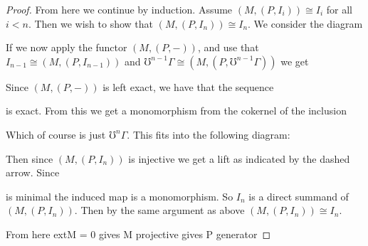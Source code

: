 \begin{theorem}
\begin{proof}
		From here we continue by induction. Assume $(M,(P,I_i)) \cong I_i$ for all $i < n$. Then we wish to show that $(M, (P, I_n)) \cong I_n$. We consider the diagram
		\begin{center}
		\end{center}
		If we now apply the functor $(M, (P, -))$, and use that $I_{n-1} \cong (M,(P,I_{n-1}))$ and $\mho^{n-1}\Gamma \cong (M,(P,\mho^{n-1}\Gamma))$ we get
		\begin{center}
		\end{center}
		
		Since $(M,(P,-))$ is left exact, we have that the sequence 
		\begin{center}
		\end{center}
		is exact. From this we get a monomorphism from the cokernel of the inclusion 
		Which of course is just $\mho^n\Gamma$. This fits into the following diagram:
		\begin{center}
		\end{center}
		
		Then since $(M, (P, I_n))$ is injective we get a lift as indicated by the dashed arrow. Since 
		is minimal the induced map is a monomorphism. So $I_n$ is a direct summand of $(M, (P, I_n))$. Then by the same argument as above $(M,(P,I_n))\cong I_n$.
		
		From here extM = 0 gives M projective gives P generator 
	\end{proof}
\end{theorem}

